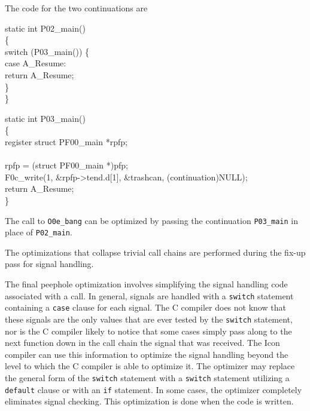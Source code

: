 \noindent
The code for the two continuations are 

\goodbreak
\begin{iconcode}
static int P02\_main()\\
\{\\
\>switch (P03\_main()) \{\\
\>\>case A\_Resume:\\
\>\>\>return A\_Resume;\\
\>\>\}\\
\}\\
\end{iconcode}

\begin{iconcode}
static int P03\_main()\\
\{\\
\>register struct PF00\_main *rpfp;\\
\\
\>rpfp = (struct PF00\_main *)pfp;\\
\>F0c\_write(1, \&rpfp->tend.d[1], \&trashcan, (continuation)NULL);\\
\>return A\_Resume;\\
\}\\
\end{iconcode}

\noindent
The call to \texttt{O0e\_bang} can be optimized by passing the
continuation \texttt{P03\_main} in place of \texttt{P02\_main}.

The optimizations that collapse trivial call chains are performed
during the fix-up pass for signal handling.

The final peephole optimization involves simplifying the signal
handling code associated with a call. In general, signals are handled
with a \texttt{switch} statement containing a \texttt{case} clause for
each signal. The C compiler does not know that these signals are the
only values that are ever tested by the \texttt{switch} statement, nor
is the C compiler likely to notice that some cases simply pass along
to the next function down in the call chain the signal that was
received. The Icon compiler can use this information to optimize the
signal handling beyond the level to which the C compiler is able to
optimize it. The optimizer may replace the general form of the
\texttt{switch} statement with a \texttt{switch} statement utilizing a
\texttt{default} clause or with an \texttt{if} statement. In some
cases, the optimizer completely eliminates signal checking. This
optimization is done when the code is written.

